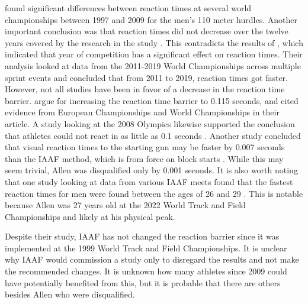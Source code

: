 \documentclass[12pt, letterpaper, titlepage]{article}
\begin{document}
\citet{pilianidis2012start} found
significant differences between reaction times at several world championships
between 1997 and 2009 for the men's 110 meter hurdles.  Another important
conclusion was that reaction times did not decrease over the twelve years
covered by the research in the study \citep{pilianidis2012start}. This 
contradicts the results of \citet{zhang2021correlation}, which indicated that 
year of competition has a significant effect on reaction times.  Their
analysis looked at data from the 2011-2019 World Championships across multiple
sprint events and concluded that from 2011 to 2019, reaction times got
faster. However, not all studies have been in favor of a decrease in the
reaction time barrier. \citet*{brosnan2017effects} argue for increasing 
the reaction time barrier to 0.115 seconds, and cited evidence from European 
Championships and World Championships in their article.  A study looking 
at the 2008 Olympics likewise supported the conclusion that athletes could not
react in as little as 0.1 seconds \citep{lipps2011implications}.  Another study
concluded that visual reaction times to the starting gun may be faster by 0.007
seconds than the IAAF method, which is from force on block starts 
\citep{holmes2018method}.  While this may seem trivial, Allen was disqualified
only by 0.001 seconds. It is also worth noting that one study looking at data 
from various IAAF meets found that the fastest reaction times for men were found
between the ages of 26 and 29 \citep{tonnessen2013reaction}.  This is notable 
because Allen was 27 years old at the 2022 World Track and Field Championships 
and likely at his physical peak.



Despite their study, IAAF has not changed the reaction barrier since it was
implemented at the 1999 World Track and Field Championships.  It is unclear
why IAAF would commission a study only to disregard the results and not
make the recommended changes.  It is unknown how many athletes since 2009 could
have potentially benefited from this, but it is probable that there are others
besides Allen who were disqualified.
\end{document}
